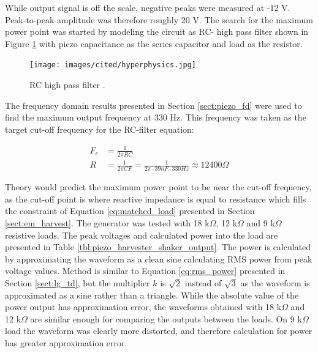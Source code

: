 While output signal is off the scale, negative peaks were measured at -12 V. Peak-to-peak amplitude was therefore roughly 20 V. The search for the maximum power point was started by modeling the circuit as RC- high pass filter shown in Figure \ref{fig:rc_highpass} with piezo capacitance as the series capacitor and load as the resistor. 

\begin{figure}[htb]
\begin{center}
\texttt{[image: images/cited/hyperphysics.jpg]}
\end{center}
\caption{\label{fig:rc_highpass} RC high pass filter \cite{hyperphysics}.}
\end{figure}

The frequency domain results presented in Section \ref{sect:piezo_fd} were used to find the maximum output frequency at 330 Hz. This frequency was taken as the target cut-off frequency for the RC-filter equation:

\begin{equation}
\begin{split}
  F_c &= \frac{1}{2 \pi R C} \\
  R   &= \frac{1}{2 \pi C F}  = \frac{1}{2 \pi \cdot 39 nF \cdot 330 Hz} \approx 12 400 \Omega 
\end{split}
\end{equation}

Theory would predict the maximum power point to be near the cut-off frequency, as the cut-off point is where reactive impedance is equal to resistance which fills the constraint of Equation \eqref{eq:matched_load} presented in Section \ref{sect:em_harvest}. The generator was tested with 18 k$\Omega$, 12 k$\Omega$ and 9 k$\Omega$ resistive loads. The peak voltages and calculated power into the load are presented in Table \ref{tbl:piezo_harvester_shaker_output}. The power is calculated by approximating the waveform as a clean sine calculating RMS power from peak voltage values. Method is similar to Equation \eqref{eq:rms_power} presented in Section \ref{sect:lg_td}, but the multiplier $k$ is $\sqrt{2}$ instead of $\sqrt{3}$ as the waveform is approximated as a sine rather than a triangle. While the absolute value of the power output has approximation error, the waveforms obtained with 18 k$\Omega$ and 12 k$\Omega$ are similar enough for comparing the outputs between the loads. On 9 k$\Omega$ load the waveform was clearly more distorted, and therefore calculation for power has greater approximation error.

